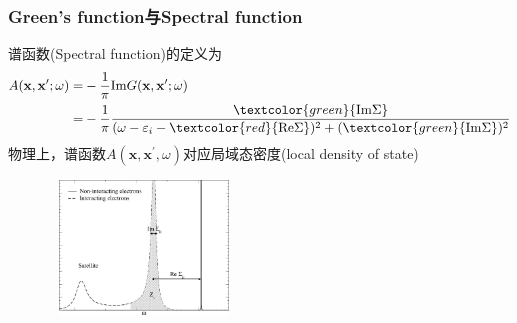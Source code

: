 {\frame
{
	\frametitle{\textrm{Green's function}与\textrm{Spectral function}}
	谱函数\textrm{(Spectral function)}的定义为
	\begin{displaymath}
		\begin{aligned}
			A(\mathbf{x},\mathbf{x}^{\prime};\omega)=&-\dfrac1{\pi}\mathrm{Im}G(\mathbf{x},\mathbf{x}^{\prime};\omega)\\
			=&-\frac1{\pi}\frac{\textcolor{green}{\mathrm{Im}\Sigma}}{(\omega-\varepsilon_i-\textcolor{red}{\mathrm{Re}\Sigma})^2+(\textcolor{green}{\mathrm{Im}\Sigma})^2}
		\end{aligned}
	\end{displaymath}
	物理上，谱函数$A(\mathbf{x},\mathbf{x}^{\prime},\omega)$对应局域态密度\textrm{(local density of state)}
\begin{figure}[h!]
\centering
\includegraphics[height=1.4in,width=2.00in,viewport=0 0 1050 800,clip]{Figures/GW_spectral-function.png}
\label{Spectral_function}
\end{figure}
}

}
